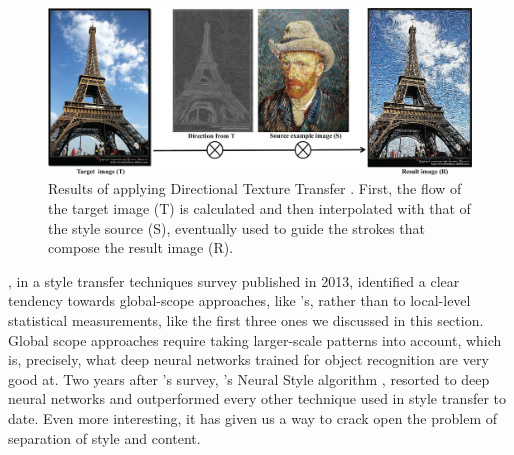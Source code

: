 \begin{figure}[htbp]
  \includegraphics[width=\textwidth]{gfx/style-transfer-directional}
  \caption{
    Results of applying Directional Texture Transfer \cite{Lee2010}.
    First, the flow of the target image (T) is calculated and then interpolated with that of the style source (S), eventually used to guide the strokes that compose the result image (R).
  }
  \label{fig:sec:context:style-transfer:style-transfer-directional}
\end{figure}

\citeauthor{Kyprianidis2013}, in a style transfer techniques survey \cite{Kyprianidis2013} published in 2013, identified a clear tendency towards global-scope approaches, like \citeauthor{Lee2010}'s, rather than to local-level statistical measurements, like the first three ones we discussed in this section.
Global scope approaches require taking larger-scale patterns into account, which is, precisely, what deep neural networks trained for object recognition are very good at.
Two years after \citeauthor{Kyprianidis2013}'s survey, \citeauthor{Gatys2015B}'s Neural Style algorithm \cite{Gatys2015B}, resorted to deep neural networks and outperformed every other technique used in style transfer to date.
Even more interesting, it has given us a way to crack open the problem of separation of style and content.
